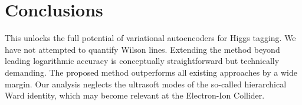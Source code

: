 \section{Conclusions}\label{sec:conclusions}

This unlocks the full potential of variational autoencoders for Higgs
tagging. We have not attempted to quantify Wilson lines. Extending the
method beyond leading logarithmic accuracy is conceptually
straightforward but technically demanding. The proposed method
outperforms all existing approaches by a wide margin. Our analysis
neglects the ultrasoft modes of the so-called hierarchical Ward
identity, which may become relevant at the Electron-Ion Collider.

